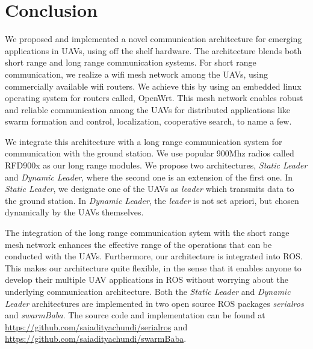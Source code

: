 
\chapter{Conclusion} %

\label{Chapter4} %


We proposed and implemented a novel communication architecture for emerging applications in UAVs, using off the shelf hardware. The architecture blends both short range and long range communication systems. For short range communication, we realize a wifi mesh network among the UAVs, using commercially available wifi routers. We achieve this by using an embedded linux operating system for routers called, OpenWrt. This mesh network enables robust and reliable communication among the UAVs for distributed applications like swarm formation and control, localization, cooperative search, to name a few.

We integrate this architecture with a long range communication system for communication with the ground station. We use popular 900Mhz radios called RFD900x as our long range modules. We propose two architectures, \textit{Static Leader} and \textit{Dynamic Leader}, where the second one is an extension of the first one. In \textit{Static Leader}, we designate one of the UAVs as \textit{leader} which transmits data to the ground station. In \textit{Dynamic Leader}, the \textit{leader} is not set apriori, but chosen dynamically by the UAVs themselves.

The integration of the long range communication sytem with the short range mesh network enhances the effective range of the operations that can be conducted with the  UAVs. Furthermore, our architecture is integrated into ROS. This makes our architecture quite flexible, in the sense that it enables anyone to develop their multiple UAV applications in ROS without worrying about the underlying communication architecture. Both the \textit{Static Leader} and \textit{Dynamic Leader} architectures are implemented in two open source ROS packages \textit{serialros} and \textit{swarmBaba}. The source code and implementation can be found at \url{https://github.com/saiadityachundi/serialros} and \url{https://github.com/saiadityachundi/swarmBaba}.


